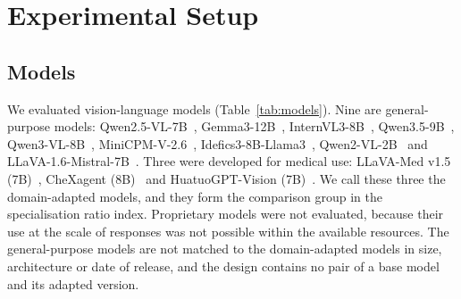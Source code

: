 \section{Experimental Setup}\label{sec:setup}

\subsection{Models}\label{sec:models}
We evaluated \Nmodels{} vision-language models (Table~\ref{tab:models}). Nine are general-purpose models: Qwen2.5-VL-7B~\citep{bai2025qwen25vl}, Gemma3-12B~\citep{gemma2025gemma3}, InternVL3-8B~\citep{zhu2025internvl3}, Qwen3.5-9B~\citep{qwen2026qwen35}, Qwen3-VL-8B~\citep{bai2025qwen3vl}, MiniCPM-V-2.6~\citep{yao2024minicpmv}, Idefics3-8B-Llama3~\citep{laurencon2024idefics3}, Qwen2-VL-2B~\citep{wang2024qwen2vl} and LLaVA-1.6-Mistral-7B~\citep{liu2024llavanext}. Three were developed for medical use: LLaVA-Med v1.5 (7B)~\citep{li2023llavamed}, CheXagent (8B)~\citep{chen2024chexagent} and HuatuoGPT-Vision (7B)~\citep{chen2024huatuogptvision}. We call these three the domain-adapted models, and they form the comparison group in the specialisation ratio index. Proprietary models were not evaluated, because their use at the scale of \Nresponses{} responses was not possible within the available resources. The general-purpose models are not matched to the domain-adapted models in size, architecture or date of release, and the design contains no pair of a base model and its adapted version.



